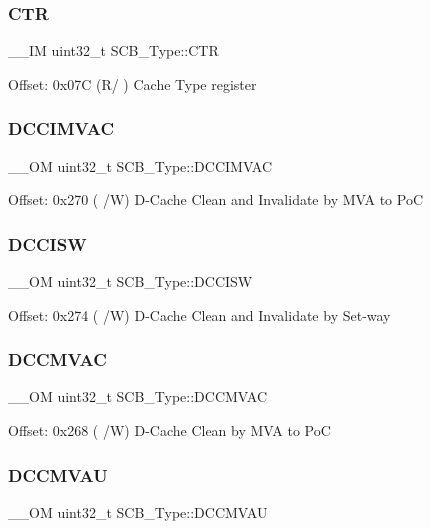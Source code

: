 \subsubsection{\texorpdfstring{CTR}{CTR}}
{\footnotesize\ttfamily \+\_\+\+\_\+\+IM uint32\+\_\+t S\+C\+B\+\_\+\+Type\+::\+C\+TR}

Offset\+: 0x07C (R/ ) Cache Type register \mbox{\label{structSCB__Type_a4f59813582b53feb5f1afbbad3db2022}} 
\subsubsection{\texorpdfstring{DCCIMVAC}{DCCIMVAC}}
{\footnotesize\ttfamily \+\_\+\+\_\+\+OM uint32\+\_\+t S\+C\+B\+\_\+\+Type\+::\+D\+C\+C\+I\+M\+V\+AC}

Offset\+: 0x270 ( /W) D-\/\+Cache Clean and Invalidate by M\+VA to PoC \mbox{\label{structSCB__Type_af50f7a0a9574fe0e24a68bb4eca75140}} 
\subsubsection{\texorpdfstring{DCCISW}{DCCISW}}
{\footnotesize\ttfamily \+\_\+\+\_\+\+OM uint32\+\_\+t S\+C\+B\+\_\+\+Type\+::\+D\+C\+C\+I\+SW}

Offset\+: 0x274 ( /W) D-\/\+Cache Clean and Invalidate by Set-\/way \mbox{\label{structSCB__Type_a042e3622c98de4e908cfda4f70d1f097}} 
\subsubsection{\texorpdfstring{DCCMVAC}{DCCMVAC}}
{\footnotesize\ttfamily \+\_\+\+\_\+\+OM uint32\+\_\+t S\+C\+B\+\_\+\+Type\+::\+D\+C\+C\+M\+V\+AC}

Offset\+: 0x268 ( /W) D-\/\+Cache Clean by M\+VA to PoC \mbox{\label{structSCB__Type_aae3caeea159ab54859ea11397f942cfa}} 
\subsubsection{\texorpdfstring{DCCMVAU}{DCCMVAU}}
{\footnotesize\ttfamily \+\_\+\+\_\+\+OM uint32\+\_\+t S\+C\+B\+\_\+\+Type\+::\+D\+C\+C\+M\+V\+AU}

